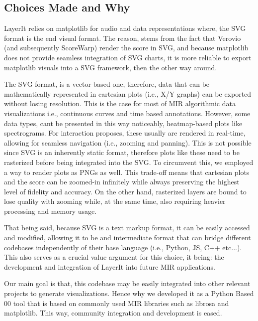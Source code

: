 \subsection{Choices Made and Why}
LayerIt relies on matplotlib for audio and data representations where, the \ac{SVG} format is the end visual format. The reason, stems from the fact that Verovio (and subsequently ScoreWarp) render the score in \ac{SVG}, and because matplotlib does not provide seamless integration of \ac{SVG} charts, it is more reliable to export matplotlib visuals into a \ac{SVG} framework, then the other way around.

The \ac{SVG} format, is a vector-based one, therefore, data that can be mathematically represented in cartesian plots (i.e., X/Y graphs) can be exported without losing resolution. This is the case for most of \ac{MIR} algorithmic data visualizations i.e., continuous curves and time based annotations. However, some data types, cant be presented in this way noticeably, heatmap-based plots like spectrograms. For interaction proposes, these usually are rendered in real-time, allowing for seamless navigation (i.e., zooming and panning). This is not possible since \ac{SVG} is an inherently static format, therefore plots like these need to be rasterized before being integrated into the \ac{SVG}. To circumvent this, we employed a way to render plots as \ac{PNG}s as well. This trade-off means that cartesian plots and the score can be zoomed-in infinitely while always preserving the highest level of fidelity and accuracy. On the other hand, rasterized layers are bound to lose quality with zooming while, at the same time, also requiring heavier processing and memory usage. 

That being said, because \ac{SVG} is a text markup format, it can be easily accessed and modified, allowing it to be and intermediate format that can bridge different codebases independently of their base language (i.e., Python, \ac{JS}, C++ etc...). This also serves as a crucial value argument for this choice, it being: the development and integration of LayerIt into future \ac{MIR} applications.

Our main goal is that, this codebase may be easily integrated into other relevant projects to generate visualizations. Hence why we developed it as a Python Based 00 tool that is based on commonly used \ac{MIR} libraries such as librosa and matplotlib. This way, community integration and development is eased. 

